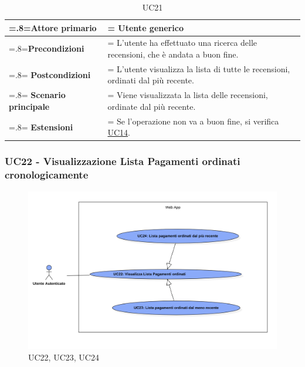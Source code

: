                 \begin{table}[H]
                    \centering
                    \renewcommand{\arraystretch}{1.8}
                    \renewcommand\tabularxcolumn[1]{m{#1}}
                    \begin{tabularx}{0.9\textwidth} {
                        >{\hsize=.8\hsize\linewidth=\hsize}X
                        >{\hsize=1.2\hsize\linewidth=\hsize}X}
                        \hline
                        \textbf{Attore primario} & Utente generico \\
                        \hline
                        \textbf{Precondizioni} & L'utente ha effettuato una ricerca delle recensioni, che è andata a buon fine. \\
                        \hline
                        \textbf{Postcondizioni} & L'utente visualizza la lista di tutte le recensioni, ordinati dal più recente. \\
                        \hline
                        \textbf{Scenario principale} & Viene visualizzata la lista delle recensioni, ordinate dal più recente. \\
                        \hline
                        \textbf{Estensioni} & Se l'operazione non va a buon fine, si verifica \hyperref[UC14]{UC14}. \\
                        \hline
                    \end{tabularx}
                    \caption{UC21}
                \end{table}

                \subsubsection{UC22 - Visualizzazione Lista Pagamenti ordinati cronologicamente}
            \label{UC22}

            \begin{figure}[H]
                \centering
                \includegraphics[scale=0.4]{src/img/UC22.png}
                \caption{UC22, UC23, UC24}
            \end{figure}

